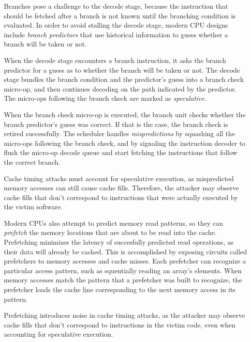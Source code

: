 Branches pose a challenge to the decode stage, because the instruction that
should be fetched after a branch is not known until the branching condition is
evaluated. In order to avoid stalling the decode stage, modern CPU designs
include \textit{branch predictors} that use historical information to guess
whether a branch will be taken or not.

When the decode stage encounters a branch instruction, it asks the branch
predictor for a guess as to whether the branch will be taken or not. The
decode stage bundles the branch condition and the predictor's guess into a
branch check micro-op, and then continues decoding on the path indicated by the
predictor. The micro-ops following the branch check are marked as
\textit{speculative}.

When the branch check micro-op is executed, the branch unit checks whether the
branch predictor's guess was correct. If that is the case, the branch check is
retired successfully. The scheduler handles \textit{mispredictions} by
squashing all the micro-ops following the branch check, and by signaling the
instruction decoder to flush the micro-op decode queue and start fetching the
instructions that follow the correct branch.

Cache timing attacks must account for speculative execution, as mispredicted
memory accesses can still cause cache fills. Therefore, the attacker may
observe cache fills that don't correspond to instructions that were actually
executed by the victim software.


Modern CPUs also attempt to predict memory read patterns, so they can
\textit{prefetch} the memory locations that are about to be read into the
cache. Prefetching minimizes the latency of succesfully predicted read
operations, as their data will already be cached. This is accomplished by
exposing circuits called prefetchers to memory accesses and cache misses. Each
prefetcher can recognize a particular access pattern, such as squentially
reading an array's elements. When memory accesses match the pattern that a
prefetcher was built to recognize, the prefetcher loads the cache line
corresponding to the next memory access in its pattern.

Prefetching introduces noise in cache timing attacks, as the attacker may
observe cache fills that don't correspond to instructions in the victim code,
even when accounting for speculative execution.
